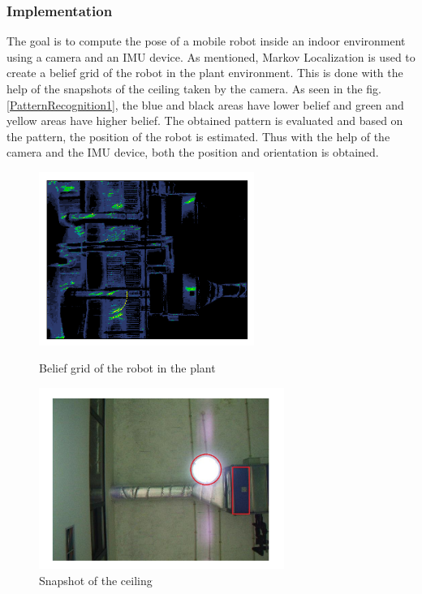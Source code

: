 \subsubsection*{Implementation}
The goal is to compute the pose of a mobile robot inside an indoor environment using a camera and an IMU device. As mentioned, Markov Localization is used to create a belief grid of the robot in the plant environment. This is done with the help of the snapshots of the ceiling taken by the camera. As seen in the fig. \ref{PatternRecognition1}, the blue and black areas have lower belief and green and yellow areas have higher belief. The obtained pattern is evaluated and based on the pattern, the position of the robot is estimated. Thus with the help of the camera and the IMU device, both the position and orientation is obtained.
\begin{figure}[!htbp]
	\centering
	\begin{minipage}{.5\textwidth}
		\centering
		\includegraphics[width = 7cm]{Pictures/beliefgrid.png}
		\caption{Belief grid of the robot in the plant}
		\label{PatternRecognition1}
	\end{minipage}%
	\begin{minipage}{.5\textwidth}
		\centering
		\includegraphics[width = 8cm]{Pictures/snapshot.png}
		\caption{Snapshot of the ceiling }
		\label{PatternRecognition2}
	\end{minipage}
\end{figure}

